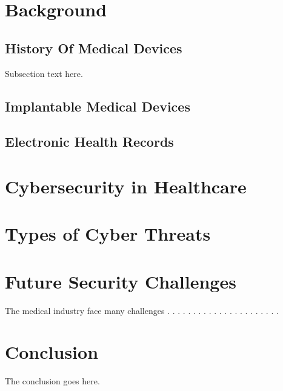 \documentclass{IEEEtran}
\begin{document}
\section{Background}
\subsection{History Of Medical Devices}
Subsection text here.
\subsection{Implantable Medical Devices}
\subsection{Electronic Health Records}


\section{Cybersecurity in Healthcare}

\section{Types of Cyber Threats}

\section{Future Security Challenges}

The medical industry face many challenges \cite{Sametinger}.
\cite{williams2015cybersecurity}.
\cite{moses2015lack}.
\cite{ferrara2019cybersecurity}.
\cite{murphy2015cybersecurity}.
\cite{stites2016secure}.
\cite{InformationSecurityonDiagnosticImagingSystem}.
\cite{Ray}.
\cite{gerard2013cybersecurity}.
\cite{mahler2018know}.
\cite{ma2019medical}.
\cite{busdicker2017role}.
\cite{martin2017cybersecurity}.
\cite{Marwan}.
\cite{FooKune:2012:TSI:2342536.2342540}.
\cite{Almohri:2017:TMM:3204094.3204113}.
\cite{tk2013inside}.
\cite{fu2014controlling}.
\cite{tanev2015value}.
\cite{Sametinger:2015:SCM:2749359.2667218}.
\cite{tanev2015value}.
\cite{CyberSecurity}.


\section{Conclusion}
The conclusion goes here.





\end{document}
